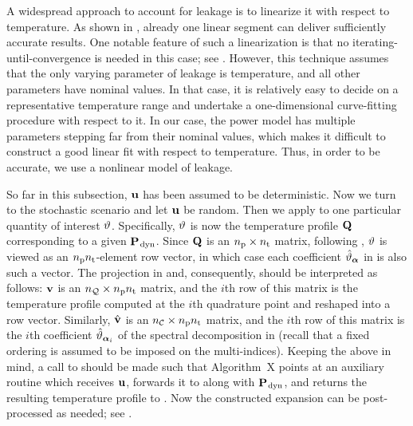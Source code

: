 \begin{remark}
A widespread approach to account for leakage is to linearize it with respect to temperature.
As shown in \cite{liu2007}, already one linear segment can deliver sufficiently accurate results.
One notable feature of such a linearization is that no iterating-until-convergence is needed in this case; see \cite{ukhov2012}.
However, this technique assumes that the only varying parameter of leakage is temperature, and all other parameters have nominal values.
In that case, it is relatively easy to decide on a representative temperature range and undertake a one-dimensional curve-fitting procedure with respect to it.
In our case, the power model has multiple parameters stepping far from their nominal values, which makes it difficult to construct a good linear fit with respect to temperature.
Thus, in order to be accurate, we use a nonlinear model of leakage.
\end{remark}

So far in this subsection, $\mathbf{u}$ has been assumed to be deterministic.
Now we turn to the stochastic scenario and let $\mathbf{u}$ be random.
Then we apply  to one particular quantity of interest $\vartheta$.
Specifically, $\vartheta$ is now the temperature profile $\mathbf{Q}$ corresponding to a given $\mathbf{P}_{\text{\kern0.1emdyn}}$.
Since $\mathbf{Q}$ is an ${n_\text{p}} \times {n_\text{t}}$ matrix, following , $\vartheta$ is viewed as an ${n_\text{p}} {n_\text{t}}$-element row vector, in which case each coefficient $\hat{\vartheta}_{\bm{\alpha}}$ in  is also such a vector.
The projection in  and, consequently,  should be interpreted as follows: $\mathbf{v}$ is an ${n_\mathcal{Q}} \times {n_\text{p}} {n_\text{t}}$ matrix, and the $i$th row of this matrix is the temperature profile computed at the $i$th quadrature point and reshaped into a row vector.
Similarly, $\hat{\mathbf{v}}$ is an ${n_\mathcal{C}} \times {n_\text{p}} {n_\text{t}}$ matrix, and the $i$th row of this matrix is the $i$th coefficient $\hat{\vartheta}_{\bm{\alpha}_i}$ of the spectral decomposition in  (recall that a fixed ordering is assumed to be imposed on the multi-indices).
Keeping the above in mind, a call to  should be made such that Algorithm~X points at an auxiliary routine which receives $\mathbf{u}$, forwards it to  along with $\mathbf{P}_{\text{\kern0.1emdyn}}$, and returns the resulting temperature profile to .
Now the constructed expansion can be post-processed as needed; see .

